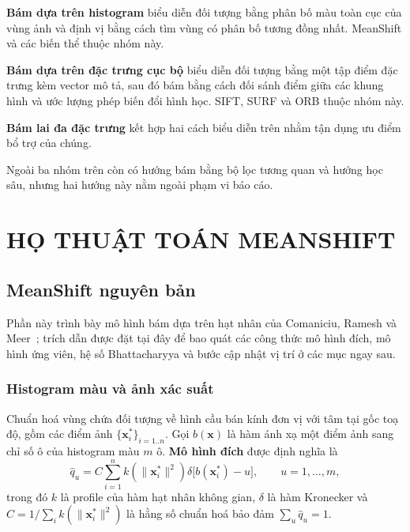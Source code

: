 \documentclass[12pt,a4paper]{article}
\numberwithin{equation}{section}
\begin{document}
\textbf{Bám dựa trên histogram} biểu diễn đối tượng bằng phân bố màu toàn cục của vùng ảnh và định
vị bằng cách tìm vùng có phân bố tương đồng nhất. MeanShift và các biến thể thuộc nhóm này.

\textbf{Bám dựa trên đặc trưng cục bộ} biểu diễn đối tượng bằng một tập điểm đặc trưng kèm vector
mô tả, sau đó bám bằng cách đối sánh điểm giữa các khung hình và ước lượng phép biến đổi hình học.
SIFT, SURF và ORB thuộc nhóm này.

\textbf{Bám lai đa đặc trưng} kết hợp hai cách biểu diễn trên nhằm tận dụng ưu điểm bổ trợ của
chúng.

Ngoài ba nhóm trên còn có hướng bám bằng bộ lọc tương quan và hướng học sâu, nhưng hai hướng này
nằm ngoài phạm vi báo cáo.

\section{HỌ THUẬT TOÁN MEANSHIFT}

\subsection{MeanShift nguyên bản}

Phần này trình bày mô hình bám dựa trên hạt nhân của Comaniciu, Ramesh và Meer~\cite{comaniciu2003}; trích dẫn được đặt tại đây để bao quát các công thức mô hình đích, mô hình ứng viên, hệ số Bhattacharyya và bước cập nhật vị trí ở các mục ngay sau.

\subsubsection{Histogram màu và ảnh xác suất}

Chuẩn hoá vùng chứa đối tượng về hình cầu bán kính đơn vị với tâm tại gốc toạ độ, gồm các điểm ảnh
$\{\mathbf{x}_i^{*}\}_{i=1..n}$. Gọi $b(\mathbf{x})$ là hàm ánh xạ một điểm ảnh sang chỉ số ô của
histogram màu $m$ ô. \textbf{Mô hình đích} được định nghĩa là
\begin{equation}
\hat{q}_u = C \sum_{i=1}^{n} k\!\left(\|\mathbf{x}_i^{*}\|^{2}\right)
\delta\big[b(\mathbf{x}_i^{*}) - u\big], \qquad u = 1,\dots,m,
\label{eq:target}
\end{equation}
trong đó $k$ là profile của hàm hạt nhân không gian, $\delta$ là hàm Kronecker và
$C = 1 / \sum_{i} k(\|\mathbf{x}_i^{*}\|^2)$ là hằng số chuẩn hoá bảo đảm $\sum_{u}\hat{q}_u = 1$.
\end{document}
